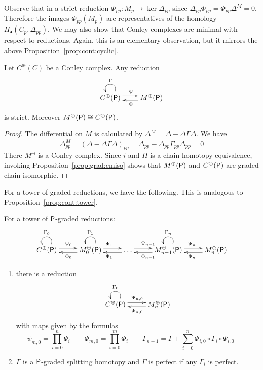 Observe that in a strict reduction $\Phi_{pp}\colon M_p\to \ker \Delta_{pp}$ since $\Delta_{pp} \Phi_{pp} = \Phi_{pp}\Delta^M = 0$.  Therefore the images $\Phi_{pp}(M_p)$ are representatives of the homology $H_\bullet(C_p,\Delta_{pp})$.    We may also show that Conley complexes are minimal with respect to reductions.  Again, this is an elementary observation, but it mirrors the above Proposition~\ref{prop:cont:cyclic}.

\begin{prop}
Let $C^\oplus(C)$ be a Conley complex.  Any reduction
 \[
\xymatrixrowsep{0.03in}
\xymatrixcolsep{0.3in}
\xymatrix{
C^\oplus(\sP)\ar@(ur,ul)_{\Gamma}  \ar[r]<3pt>^{\Psi} & \ar[l]<3pt>^{\Phi} M^\oplus(\sP) 
}
\]
is strict. Moreover $M^\oplus({\mathsf P})\cong C^\oplus({\mathsf P})$.
\end{prop}
\begin{proof}
The differential on $M$ is calculated by $\Delta^M = \Delta-\Delta\Gamma\Delta$.  We have 
\[
\Delta^M_{pp} = (\Delta-\Delta\Gamma\Delta)_{pp} = \Delta_{pp}-\Delta_{pp}\Gamma_{pp}\Delta_{pp} = 0
\]
There $M^\oplus$ is a Conley complex.  Since $i$ and $\Pi$ is a chain homotopy equivalence, invoking Proposition~\ref{prop:grad:cmiso} shows that $M^\oplus({\mathsf P})$ and $C^\oplus({\mathsf P})$ are graded chain isomorphic. 
\end{proof}

For a tower of graded reductions, we have the following.  This is analogous to Proposition~\ref{prop:cont:tower}.

\begin{prop}\label{prop:cont:gtower}
For a tower of ${\mathsf P}$-graded reductions:
\[
\xymatrixrowsep{0.03in}
\xymatrixcolsep{0.35in}
\xymatrix{
C^\oplus(\sP)    \ar@(ur,ul)_{\Gamma_0} \ar[r]<3pt>^{\Psi_0} & \ar[l]<3pt>^{\Phi_0 } M_0^\oplus(\sP)  \ar@(ur,ul)_{\Gamma_1} \ar[r]<3pt>^{\Psi_1} & \ar[l]<3pt>^{\Phi_1 }  \ldots \ar[r]<3pt>^{\Psi_{n-1}}  & \ar[l]<3pt>^{\Phi_{n-1} }M_{n-1}^\oplus(\sP)  \ar@(ur,ul)_{\Gamma_n}  \ar[r]<3pt>^{\Psi_n} & \ar[l]<3pt>^{\Phi_n} M_n^\oplus(\sP) 
}
\]
\begin{enumerate}
\item there is a reduction 
\begin{align}\label{dia:cont:tower}
\xymatrixrowsep{0.03in}
\xymatrixcolsep{0.35in}
\xymatrix{
C^\oplus(\sP)    \ar@(ur,ul)_{\Gamma_0} \ar[r]<3pt>^{\Psi_{n,0}}  & \ar[l]<3pt>^{\Phi_{n,0}} M_n^\oplus(\sP) 
}
\end{align}
with maps given by the formulas
\[
 \psi_{m,0} = \prod_{i=0}^n \Psi_i   \quad\quad   \Phi_{m,0} = \prod_{i=0}^m \Phi_i 
\quad\quad \Gamma_{n+1}= \Gamma + \sum_{i=0}^n \Phi_{i,0}\circ  \Gamma_i\circ \Psi_{i,0} \quad\quad 
\]

\item $\Gamma$ is a ${\mathsf P}$-graded splitting homotopy and $\Gamma$ is perfect if any $\Gamma_i$ is perfect.

\end{enumerate}
\end{prop}


